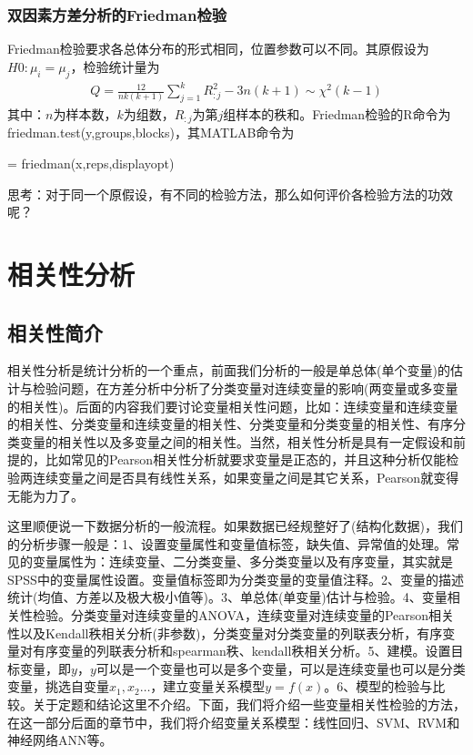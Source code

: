         \subsubsection{双因素方差分析的Friedman检验}
            Friedman检验要求各总体分布的形式相同，位置参数可以不同。其原假设为$H0:\mu_i = \mu_j$，检验统计量为
            \begin{align*}
            Q = \frac{12}{nk(k+1)} \sum_{j=1}^kR_{:j}^2 - 3n(k+1) \sim \chi^2(k-1)
            \end{align*}
            其中：$n$为样本数，$k$为组数，$R_{:j}$为第$j$组样本的秩和。Friedman检验的R命令为friedman.test(y,groups,blocks)，其MATLAB命令为
            \par
            [p,table,stats] = friedman(x,reps,displayopt)
            \par
            思考：对于同一个原假设，有不同的检验方法，那么如何评价各检验方法的功效呢？
\section{相关性分析}
    \subsection{相关性简介}
        \par
        相关性分析是统计分析的一个重点，前面我们分析的一般是单总体(单个变量)的估计与检验问题，在方差分析中分析了分类变量对连续变量的影响(两变量或多变量的相关性)。后面的内容我们要讨论变量相关性问题，比如：连续变量和连续变量的相关性、分类变量和连续变量的相关性、分类变量和分类变量的相关性、有序分类变量的相关性以及多变量之间的相关性。当然，相关性分析是具有一定假设和前提的，比如常见的Pearson相关性分析就要求变量是正态的，并且这种分析仅能检验两连续变量之间是否具有线性关系，如果变量之间是其它关系，Pearson就变得无能为力了。
        \par
        这里顺便说一下数据分析的一般流程。如果数据已经规整好了(结构化数据)，我们的分析步骤一般是：1、设置变量属性和变量值标签，缺失值、异常值的处理。常见的变量属性为：连续变量、二分类变量、多分类变量以及有序变量，其实就是SPSS中的变量属性设置。变量值标签即为分类变量的变量值注释。2、变量的描述统计(均值、方差以及极大极小值等)。3、单总体(单变量)估计与检验。4、变量相关性检验。分类变量对连续变量的ANOVA，连续变量对连续变量的Pearson相关性以及Kendall秩相关分析(非参数)，分类变量对分类变量的列联表分析，有序变量对有序变量的列联表分析和spearman秩、kendall秩相关分析。5、建模。设置目标变量，即$y$，$y$可以是一个变量也可以是多个变量，可以是连续变量也可以是分类变量，挑选自变量$x_1,x_2\dots$，建立变量关系模型$y = f(x)$。6、模型的检验与比较。关于定题和结论这里不介绍。下面，我们将介绍一些变量相关性检验的方法，在这一部分后面的章节中，我们将介绍变量关系模型：线性回归、SVM、RVM和神经网络ANN等。
